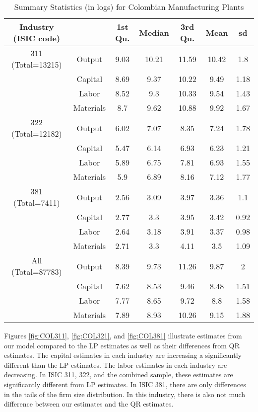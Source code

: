 \documentclass[11pt]{article}
\begin{document}
\begin{table}[H]
\centering
\caption{Summary Statistics (in logs) for Colombian Manufacturing Plants}
\begin{tabular}{ccccccc}
  \hline\hline Industry (ISIC code) &   & 1st Qu. & Median & 3rd Qu. & Mean & sd \\ 
  \hline
311 (Total=13215) & Output & 9.03 & 10.21 & 11.59 & 10.42 & 1.8 \\ 
   & Capital & 8.69 & 9.37 & 10.22 & 9.49 & 1.18 \\ 
   & Labor & 8.52 & 9.3 & 10.33 & 9.54 & 1.43 \\ 
   & Materials & 8.7 & 9.62 & 10.88 & 9.92 & 1.67 \\ 
  322 (Total=12182) & Output & 6.02 & 7.07 & 8.35 & 7.24 & 1.78 \\ 
   & Capital & 5.47 & 6.14 & 6.93 & 6.23 & 1.21 \\ 
   & Labor & 5.89 & 6.75 & 7.81 & 6.93 & 1.55 \\ 
   & Materials & 5.9 & 6.89 & 8.16 & 7.12 & 1.77 \\ 
  381 (Total=7411) & Output & 2.56 & 3.09 & 3.97 & 3.36 & 1.1 \\ 
   & Capital & 2.77 & 3.3 & 3.95 & 3.42 & 0.92 \\ 
   & Labor & 2.64 & 3.18 & 3.91 & 3.37 & 0.98 \\ 
   & Materials & 2.71 & 3.3 & 4.11 & 3.5 & 1.09 \\ 
  All (Total=87783) & Output & 8.39 & 9.73 & 11.26 & 9.87 & 2 \\ 
   & Capital & 7.62 & 8.53 & 9.46 & 8.48 & 1.51 \\ 
   & Labor & 7.77 & 8.65 & 9.72 & 8.8 & 1.58 \\ 
   & Materials & 7.89 & 8.93 & 10.26 & 9.15 & 1.88 \\ 
   \hline
\end{tabular}
\label{COLsum}
\end{table}

Figures \ref{fig:COL311}, \ref{fig:COL321}, and \ref{fig:COL381} illustrate estimates from our model compared to the LP estimates as well as their differences from QR estimates. The capital estimates in each industry are increasing a significantly different than the LP estimates. The labor estimates in each industry are decreasing. In ISIC 311, 322, and the combined sample, these estimates are significantly different from LP estimates. In ISIC 381, there are only differences in the tails of the firm size distribution. In this industry, there is also not much difference between our estimates and the QR estimates.
\end{document}

